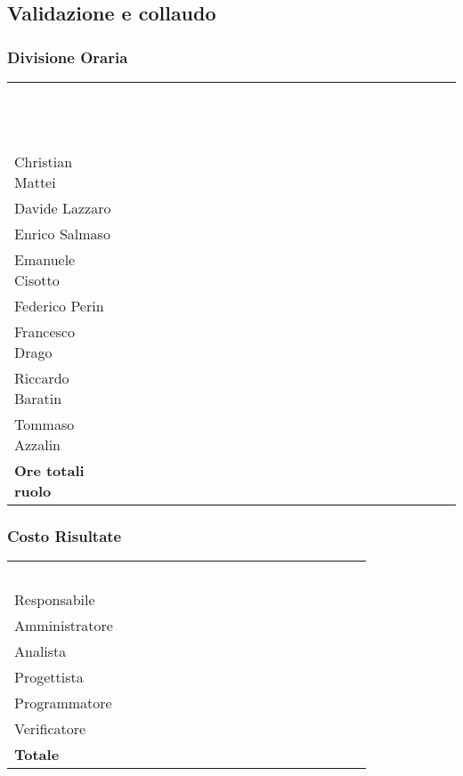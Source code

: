 \subsection{Validazione e collaudo}

\subsubsection{Divisione Oraria}
{
	\renewcommand{\arraystretch}{2}
	\centering
	\begin{longtable}{ C{5cm} C{1cm} C{1cm} C{1cm} C{1cm} C{1cm} C{1cm} C{3cm}}
		\textcolor{white}{\textbf{Nome membro del gruppo}} & \textcolor{white}{\textbf{RE}} & \textcolor{white}{\textbf{AM}} & \textcolor{white}{\textbf{AN}} & \textcolor{white}{\textbf{PT}} & \textcolor{white}{\textbf{PR}} & \textcolor{white}{\textbf{VE}} & \textcolor{white}{\textbf{Ore complessive}}\\	
        
        Christian Mattei & & & & & & & \\
        Davide Lazzaro & & & & & & & \\
        Enrico Salmaso & & & & & & & \\
        Emanuele Cisotto & & & & & & & \\
        Federico Perin & & & & & & & \\
        Francesco Drago & & & & & & & \\
        Riccardo Baratin & & & & & & & \\
        Tommaso Azzalin & & & & & & & \\
        \textbf{Ore totali ruolo} & & & & & & & \\
		
	\end{longtable}
}

\subsubsection{Costo Risultate}
{
	\renewcommand{\arraystretch}{2}
	\centering
	\begin{longtable}{ C{3cm} C{2cm} C{4cm}}
		\textcolor{white}{\textbf{Ruolo}} & \textcolor{white}{\textbf{Totale ore}} & \textcolor{white}{\textbf{Costo Ruolo in euro}}\\	
        
        Responsabile & & \\
        Amministratore & & \\
        Analista & & \\
        Progettista & & \\
        Programmatore & & \\
        Verificatore & & \\
        \textbf{Totale} & & \\
		
	\end{longtable}
}

